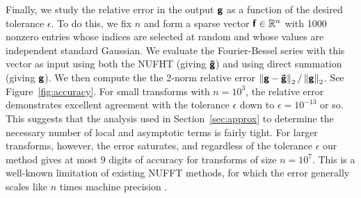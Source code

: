 Finally, we study the relative error in the output $\vct{g}$ as a function of
the desired tolerance $\epsilon$. To do this, we fix $n$ and form a sparse
vector $\vct{f} \in \R^n$ with 1000 nonzero entries whose indices are selected
at random and whose values are independent standard Gaussian. We evaluate the
Fourier-Bessel series with this vector as input using both the NUFHT (giving
$\vct{\tilde{g}}$) and using direct summation (giving $\vct{g}$). We then
compute the the 2-norm relative error $\norm[2]{\vct{g} - \vct{\tilde{g}}} /
\norm[2]{\vct{g}}$. See Figure~\ref{fig:accuracy}. For small transforms with
$n=10^3$, the relative error demonstrates excellent agreement with the tolerance
$\epsilon$ down to $\epsilon = 10^{-13}$ or so. This suggests that the analysis
used in Section~\ref{sec:approx} to determine the necessary number of local and
asymptotic terms is fairly tight. For larger transforms, however, the error
saturates, and regardless of the tolerance $\epsilon$ our method gives at most 9
digits of accuracy for transforms of size $n=10^7$. This is a well-known
limitation of existing NUFFT methods, for which the error generally scales like
$n$ times machine precision \cite[Remark 9]{barnett2019parallel}.

